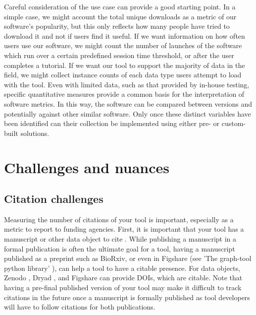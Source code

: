 \documentclass{article}
\begin{document}
Careful consideration of the use case can provide a good starting point. In a simple case, we might account the total unique downloads as a metric of our software’s popularity, but this only reflects how many people have tried to download it and not if users find it useful. If we want information on how often users use our software, we might count the number of launches of the software which run over a certain predefined session time threshold, or after the user completes a tutorial. If we want our tool to support the majority of data in the field, we might collect instance counts of each data type users attempt to load with the tool. Even with limited data, such as that provided by in-house testing, specific quantitative measures provide a common basis for the interpretation of software metrics. In this way, the software can be compared between versions and potentially against other similar software. Only once these distinct variables have been identified can their collection be implemented using either pre- or custom-built solutions.

\section{Challenges and nuances}

\subsection{Citation challenges}
Measuring the number of citations of your tool is important, especially as a metric to report to funding agencies. First, it is important that your tool has a manuscript or other data object to cite \cite{chue_hong_software_2019}. While publishing a manuscript in a formal publication is often the ultimate goal for a tool, having a manuscript published as a preprint such as BioRxiv, or even in Figshare (see 'The graph-tool python library' \cite{peixoto_graph-tool_2017}), can help a tool to have a citable presence. For data objects, Zenodo \cite{zenodo}, Dryad \cite{datadryad}, and Figshare \cite{figshare} can provide DOIs, which are citable. Note that having a pre-final published version of your tool may make it difficult to track citations in the future once a manuscript is formally published as tool developers will have to follow citations for both publications.
\end{document}
